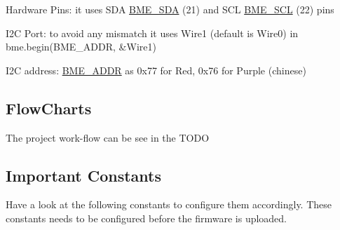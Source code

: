 \begin{DoxyItemize}
\item Hardware Pins\+: it uses S\+DA \mbox{\hyperlink{sensor_8h_ad9e594e426bce833af06dea308dbbf9a}{B\+M\+E\+\_\+\+S\+DA}} (21) and S\+CL \mbox{\hyperlink{sensor_8h_a5db75d8e5f3deda546603b949c520446}{B\+M\+E\+\_\+\+S\+CL}} (22) pins
\item I2C Port\+: to avoid any mismatch it uses Wire1 (default is Wire0) in bme.\+begin(\+B\+M\+E\+\_\+\+A\+D\+D\+R, \&\+Wire1)
\item I2C address\+: \mbox{\hyperlink{sensor_8h_a9f6149e98e70e1d5be5f0f33921cb7d7}{B\+M\+E\+\_\+\+A\+D\+DR}} as 0x77 for Red, 0x76 for Purple (chinese)
\end{DoxyItemize}\hypertarget{index_flowchart}{}\subsection{Flow\+Charts}\label{index_flowchart}
The project work-\/flow can be see in the T\+O\+DO\hypertarget{index_const}{}\subsection{Important Constants}\label{index_const}
Have a look at the following constants to configure them accordingly. These constants needs to be configured before the firmware is uploaded.
